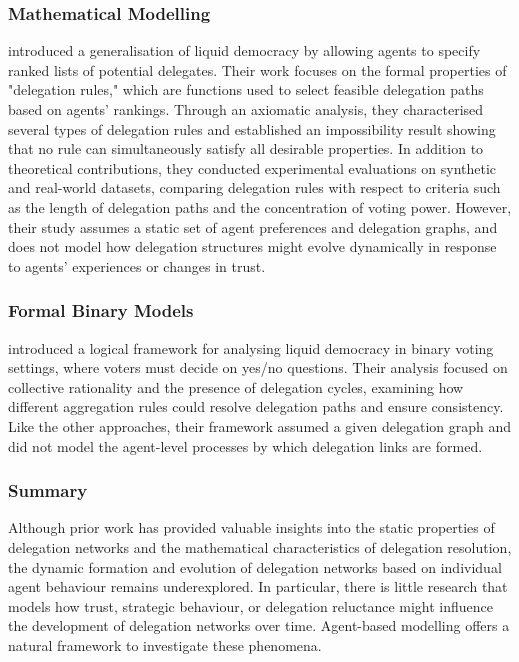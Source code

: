 \subsubsection{Mathematical Modelling}

\citet{brill_liquid_2021} introduced a generalisation of liquid democracy by allowing agents to specify ranked lists of potential delegates. Their work focuses on the formal properties of "delegation rules," which are functions used to select feasible delegation paths based on agents' rankings. Through an axiomatic analysis, they characterised several types of delegation rules and established an impossibility result showing that no rule can simultaneously satisfy all desirable properties. In addition to theoretical contributions, they conducted experimental evaluations on synthetic and real-world datasets, comparing delegation rules with respect to criteria such as the length of delegation paths and the concentration of voting power. However, their study assumes a static set of agent preferences and delegation graphs, and does not model how delegation structures might evolve dynamically in response to agents' experiences or changes in trust.

\subsubsection{Formal Binary Models}

\citet{christoffBinaryVotingDelegable2017} introduced a logical framework for analysing liquid democracy in binary voting settings, where voters must decide on yes/no questions. Their analysis focused on collective rationality and the presence of delegation cycles, examining how different aggregation rules could resolve delegation paths and ensure consistency. Like the other approaches, their framework assumed a given delegation graph and did not model the agent-level processes by which delegation links are formed.

\subsubsection{Summary}

Although prior work has provided valuable insights into the static properties of delegation networks and the mathematical characteristics of delegation resolution, the dynamic formation and evolution of delegation networks based on individual agent behaviour remains underexplored. In particular, there is little research that models how trust, strategic behaviour, or delegation reluctance might influence the development of delegation networks over time. Agent-based modelling offers a natural framework to investigate these phenomena.

